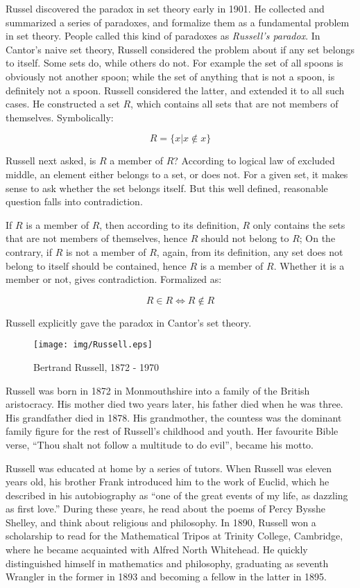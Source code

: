 \documentclass{article}
\begin{document}
Russel discovered the paradox in set theory early in 1901. He collected and summarized a series of paradoxes, and formalize them as a fundamental problem in set theory. People called this kind of paradoxes as {\em Russell's paradox}. In Cantor's naive set theory, Russell considered the problem about if any set belongs to itself. Some sets do, while others do not. For example the set of all spoons is obviously not another spoon; while the set of anything that is not a spoon, is definitely not a spoon. Russell considered the latter, and extended it to all such cases. He constructed a set $R$, which contains all sets that are not members of themselves. Symbolically:

\[
R = \{ x | x \notin x \}
\]

Russell next asked, is $R$ a member of $R$? According to logical law of excluded middle, an element either belongs to a set, or does not. For a given set, it makes sense to ask whether the set belongs itself. But this well defined, reasonable question falls into contradiction.

If $R$ is a member of $R$, then according to its definition, $R$ only contains the sets that are not members of themselves, hence $R$ should not belong to $R$; On the contrary, if $R$ is not a member of $R$, again, from its definition, any set does not belong to itself should be contained, hence $R$ is a member of $R$. Whether it is a member or not, gives contradiction. Formalized as:

\[
R \in R \iff R \notin R
\]

Russell explicitly gave the paradox in Cantor's set theory.

\begin{wrapfigure}{R}{0.3\textwidth}
 \centering
 \texttt{[image: img/Russell.eps]}
 \captionsetup{labelformat=empty}
 \caption{Bertrand Russell, 1872 - 1970}
 \label{fig:Russell}
\end{wrapfigure}

Russell was born in 1872 in Monmouthshire into a family of the British aristocracy. His mother died two years later, his father died when he was three. His grandfather died in 1878. His grandmother, the countess was the dominant family figure for the rest of Russell's childhood and youth. Her favourite Bible verse, ``Thou shalt not follow a multitude to do evil'', became his motto.

Russell was educated at home by a series of tutors. When Russell was eleven years old, his brother Frank introduced him to the work of Euclid, which he described in his autobiography as ``one of the great events of my life, as dazzling as first love.'' During these years, he read about the poems of Percy Bysshe Shelley, and think about religious and philosophy. In 1890, Russell won a scholarship to read for the Mathematical Tripos at Trinity College, Cambridge, where he became acquainted with Alfred North Whitehead. He quickly distinguished himself in mathematics and philosophy, graduating as seventh Wrangler in the former in 1893 and becoming a fellow in the latter in 1895.
\end{document}
